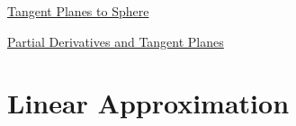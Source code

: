 \documentclass{ximera}
\begin{document}
\begin{exploration}  \label{Edf5khj4665}

\href{https://www.desmos.com/3d/d78d5a3138}{Tangent Planes to Sphere}

\end{exploration}

\begin{exploration}  \label{Ede5fhj4665}
\href{https://www.geogebra.org/m/Hud6Hnpk}{Partial Derivatives and Tangent Planes}
\end{exploration}


\section{Linear Approximation}
\end{document}
